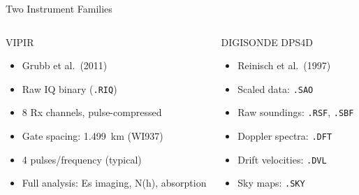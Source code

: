 \documentclass[aspectratio=169,11pt]{beamer}
\begin{document}
\begin{frame}{Two Instrument Families}
  \begin{columns}
    \begin{block}{VIPIR}
      \begin{itemize}\small
        \item Grubb et al.\ (2011)
        \item Raw IQ binary (\texttt{.RIQ})
        \item 8 Rx channels, pulse-compressed
        \item Gate spacing: 1.499~km (WI937)
        \item 4 pulses/frequency (typical)
        \item Full analysis: Es imaging, N(h), absorption
      \end{itemize}
    \end{block}
    \begin{block}{DIGISONDE DPS4D}
      \begin{itemize}\small
        \item Reinisch et al.\ (1997)
        \item Scaled data: \texttt{.SAO}
        \item Raw soundings: \texttt{.RSF}, \texttt{.SBF}
        \item Doppler spectra: \texttt{.DFT}
        \item Drift velocities: \texttt{.DVL}
        \item Sky maps: \texttt{.SKY}
      \end{itemize}
    \end{block}
  \end{columns}
\end{frame}
\end{document}

